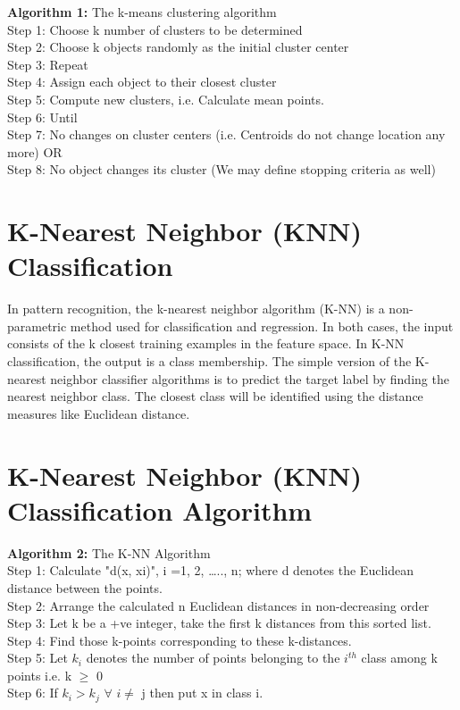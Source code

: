 \documentclass[document.tex]{subfiles}
\begin{document}
\begin{algorithm}[H]
	\textbf{Algorithm 1: }
	The k-means clustering algorithm\cite{a35}	\\
	Step 1: Choose k number of clusters to be determined\\
	Step 2: Choose k objects randomly as the initial cluster center\\
	Step 3: Repeat  \\
	Step 4: Assign each object to their closest cluster\\
	Step 5: Compute new clusters, i.e. Calculate mean points. \\
	Step 6: Until \\
	Step 7: No changes on cluster centers (i.e. Centroids do not change location any more) OR\\
	Step 8: No object changes its cluster (We may define stopping criteria as well) 
	\label{kmeans}
\end{algorithm}
\section{K-Nearest Neighbor (KNN) Classification}
In pattern recognition, the k-nearest neighbor algorithm (K-NN) is a non-parametric method used for classification and regression. In both cases, the input consists of the k closest training examples in the feature space.  In K-NN classification, the output is a class membership. The simple version of the K-nearest neighbor classifier algorithms is to predict the target label by finding the nearest neighbor class. The closest class will be identified using the distance measures like Euclidean distance.
\section{K-Nearest Neighbor (KNN) Classification Algorithm}
\begin{algorithm}[H]
	\textbf{Algorithm 2: }
	The K-NN Algorithm\cite{a36}	\\
	Step 1: Calculate "d(x, xi)", i =1, 2, ….., n; where d denotes the Euclidean distance between the points.\\
	Step 2: Arrange the calculated n Euclidean distances in non-decreasing order\\
	Step 3: Let k be a +ve integer, take the first k distances from this sorted list.\\
	Step 4: Find those k-points corresponding to these k-distances.\\
	Step 5: Let $k_i$ denotes the number of points belonging to the $i^{th}$ class among k points i.e. k $\geq$ 0\\
	Step 6: If $k_i > k_j$  $\forall$  $i \neq$ j then put x in class i.\\ 
	
\end{algorithm}
\end{document}
